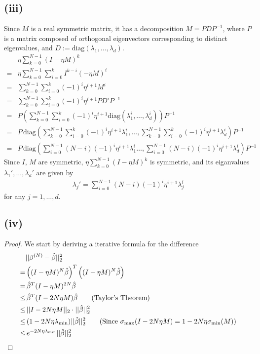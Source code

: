 \documentclass[twoside,11pt]{homework}
\begin{document}
\subsection*{(iii)}
	Since $M$ is a real symmetric matrix, it has a decomposition $M = P D P^{-1}$, 
	where $P$ is a matrix composed of orthogonal eigenvectors corresponding to distinct eigenvalues,
	and $D:= \text{diag}(\lambda_1,\dots, \lambda_d)$.
	\begin{align*}
		&\eta \sum_{k=0}^{N-1} (I-\eta M)^k \\
		=& \eta \sum_{k=0}^{N-1} \sum_{i=0}^{k} I^{k-i}(-\eta M)^i \\
		=&  \sum_{k=0}^{N-1} \sum_{i=0}^{k} (-1)^i\eta^{i+1} M^{i} \\
		=&  \sum_{k=0}^{N-1} \sum_{i=0}^{k} (-1)^i\eta^{i+1} PD^{i}P^{-1} \\
		=& P  \left(\sum_{k=0}^{N-1} \sum_{i=0}^{k}  (-1)^i\eta^{i+1}  \text{diag}(\lambda_1^i,\dots, \lambda_d^i) \right) P^{-1} \\
		=& P \, \text{diag} \left(\sum_{k=0}^{N-1} \sum_{i=0}^{k}  (-1)^i\eta^{i+1} \lambda_1^i,\dots, 
		\sum_{k=0}^{N-1} \sum_{i=0}^{k}  (-1)^i\eta^{i+1} \lambda_d^i \right)  P^{-1}\\
		=& P \, \text{diag} \left(
			\sum_{i=0}^{N-1} (N-i) (-1)^{i}\eta^{i+1}\lambda^i_1
			\dots, 
			\sum_{i=0}^{N-1} (N-i) (-1)^{i}\eta^{i+1}\lambda^i_d
		\right)  P^{-1}
	\end{align*}
	Since $I$, $M$ are symmetric, $\eta \sum_{k=0}^{N-1} (I-\eta M)^k$ is symmetric, 
	and its eiganvalues $\lambda_1',\dots, \lambda_d'$ are given by
	\begin{align*}
		\lambda_j' = \sum_{i=0}^{N-1} (N-i) (-1)^{i}\eta^{i+1}\lambda^i_j
	\end{align*}
	for any $j=1,\dots,d$.
\subsection*{(iv)}
	\begin{proof}
	We start by deriving a iterative formula for the difference
	\begin{align*}
		& ||\beta^{(N)} - \hat{\beta}||_2^2 \\
		=& \left( (I-\eta M)^N \hat\beta \right)^T \left( (I-\eta M)^N \hat\beta \right) \\
		=& \, \hat\beta^T (I-\eta M)^{2N} \hat\beta \\
		\leq& \, \hat\beta^T (I-2N\eta M) \hat\beta \tag{Taylor's Theorem} \\
		\leq& \, || I-2N\eta M ||_2 \cdot ||\hat{\beta}||_2^2 \\
		\leq & \, (1-2N\eta \lambda_{\text{min}}) ||\hat{\beta}||_2^2 
		\tag{Since $\sigma_{\text{max}}(I-2N\eta M) = 1-2N\eta \sigma_{\text{min}}(M)$} \\
		\leq& \, e^{-2N\eta\lambda_{\text{min}}}||\hat{\beta}||_2^2 
	\end{align*}
	\end{proof}
\end{document}
